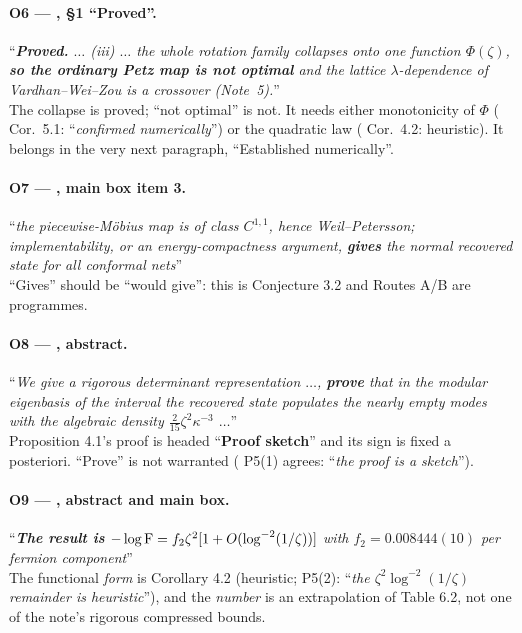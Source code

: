 \documentclass[11pt]{article}
\newcommand{\zz}{\zeta}
\begin{document}
\paragraph{O6 --- \NVI, \S1 ``Proved''. \normalfont[GAP]}
``\emph{\textbf{Proved.} $\dots$ (iii) $\dots$ the whole rotation family collapses onto one function $\Phi(\zz)$,
\textbf{so the ordinary Petz map is not optimal} and the lattice $\lambda$-dependence of Vardhan--Wei--Zou is a
crossover (Note~5).}''\\
The collapse is proved; ``not optimal'' is not.  It needs either monotonicity of $\Phi$ (\NV{} Cor.~5.1:
``\emph{confirmed numerically}'') or the quadratic law (\NV{} Cor.~4.2: heuristic).  It belongs in the very next
paragraph, ``Established numerically''.

\paragraph{O7 --- \NVI, main box item 3. \normalfont[MINOR]}
``\emph{the piecewise-M\"obius map is of class $C^{1,1}$, hence Weil--Petersson; implementability, or an
energy-compactness argument, \textbf{gives} the normal recovered state for all conformal nets}''\\
``Gives'' should be ``would give'': this is Conjecture 3.2 and Routes A/B are programmes.

\paragraph{O8 --- \NV, abstract. \normalfont[GAP]}
``\emph{We give a rigorous determinant representation $\dots$, \textbf{prove} that in the modular eigenbasis of the
interval the recovered state populates the nearly empty modes with the algebraic density $\frac2{15}\zz^2\kappa^{-3}$
$\dots$}''\\
Proposition 4.1's proof is headed ``\textbf{Proof sketch}'' and its sign is fixed a posteriori.  ``Prove'' is not
warranted (\NVI{} P5(1) agrees: ``\emph{the proof is a sketch}'').

\paragraph{O9 --- \NV, abstract and main box. \normalfont[GAP]}
``\emph{\textbf{The result is} $-\log\Fid=f_2\zz^2[1+O(\log^{-2}(1/\zz))]$ with $f_2=0.008444(10)$ per fermion
component}''\\
The functional \emph{form} is Corollary 4.2 (heuristic; \NVI{} P5(2): ``\emph{the $\zz^2\log^{-2}(1/\zz)$ remainder is
heuristic}''), and the \emph{number} is an extrapolation of Table 6.2, not one of the note's rigorous compressed bounds.
\end{document}

